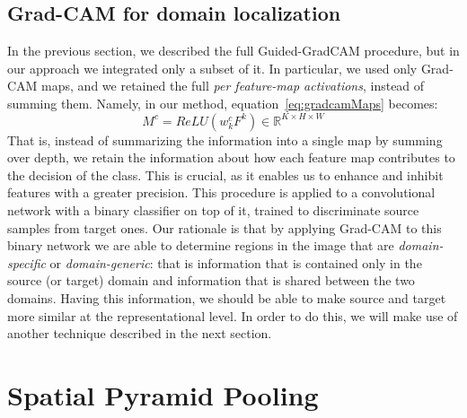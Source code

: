 \documentclass[../main.tex]{subfiles}
\begin{document}
    \subsection{Grad-CAM for domain localization}
    In the previous section, we described the full Guided-GradCAM procedure, but in our approach we integrated only a subset of it.
    In particular, we used only Grad-CAM maps, and we retained the full \textit{per feature-map activations}, instead of summing them.
    Namely, in our method, equation~\ref{eq:gradcamMaps} becomes:
    \begin{equation}\label{eq:gradcamDomain}
        M^{c} = ReLU \left( w_{k}^{c} F^{k} \right) \in \mathbb{R}^{K \times H \times W}
    \end{equation}
    That is, instead of summarizing the information into a single map by summing over depth, we retain the information about how each
    feature map contributes to the decision of the class. This is crucial, as it enables us to enhance and inhibit features with a
    greater precision. This procedure is applied to a convolutional network with a binary classifier on top of it, trained to discriminate
    source samples from target ones. Our rationale is that by applying Grad-CAM to this binary network we are able to determine regions
    in the image that are \textit{domain-specific} or \textit{domain-generic}: that is information that is contained only in the source
    (or target) domain and information that is shared between the two domains. Having this information, we should be able to make source
    and target more similar at the representational level. In order to do this, we will make use of another technique described in the
    next section.

    \section{Spatial Pyramid Pooling}
\end{document}
